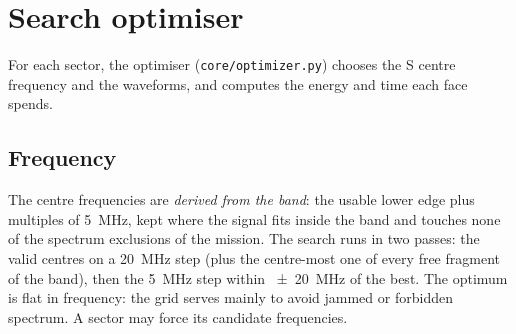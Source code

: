 \documentclass[11pt,a4paper]{article}
\newcommand{\code}[1]{\texttt{\small #1}}
\begin{document}
\section{Search optimiser}\label{sec:opt}
For each sector, the optimiser (\code{core/optimizer.py}) chooses the S centre frequency and the waveforms, and
computes the energy and time each face spends.

\subsection{Frequency}
The centre frequencies are \emph{derived from the band}: the usable lower edge plus multiples of \SI{5}{MHz}, kept
where the signal fits inside the band and touches none of the spectrum exclusions of the mission. The search runs in
two passes: the valid centres on a \SI{20}{MHz} step (plus the centre-most one of every free fragment of the band),
then the \SI{5}{MHz} step within \SI{\pm20}{MHz} of the best. The optimum is flat in frequency: the grid serves mainly
to avoid jammed or forbidden spectrum. A sector may force its candidate frequencies.
\end{document}
